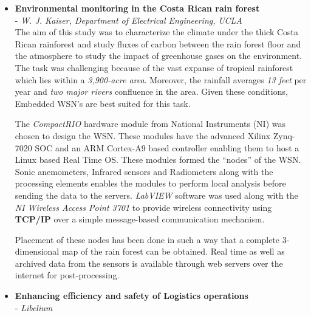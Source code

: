 \documentclass[fleqn, letterpaper, 11.5pt]{article}
\begin{document}
\begin{itemize}
\bigskip

\item \textbf{Environmental monitoring in the Costa Rican rain forest}\\
- \textit{W. J. Kaiser, Department of Electrical Engineering, UCLA} \cite{Pottie:2000:WIN:332833.332838}\\

The aim of this study was to characterize the climate under the thick Costa Rican rainforest and study fluxes of carbon between the rain forest floor and the atmosphere to study the impact of greenhouse gases on the environment. The task was challenging because of the vast expanse of tropical rainforest which lies within a \textit{3,900-acre area}. Moreover, the rainfall averages \textit{13 feet} per year and \textit{two major rivers} confluence in the area. Given these conditions, Embedded WSN's are best suited for this task.\par
The \textit{CompactRIO}\cite{CompactRIO} hardware module from National Instruments (NI) was chosen to design the WSN. These modules have the advanced Xilinx Zynq-7020 SOC and an ARM Cortex-A9 based controller enabling them to host a Linux based Real Time OS. These modules formed the \enquote{nodes} of the WSN. Sonic anemometers, Infrared sensors and Radiometers along with the processing elements enables the modules to perform local analysis before sending the data to the servers. \textit{LabVIEW} software was used along with the \textit{NI Wireless Access Point 3701}\cite{WAP3701} to provide wireless connectivity using \textbf{TCP/IP} over a simple message-based communication mechanism.\par
Placement of these nodes has been done in such a way that a complete 3-dimensional map of the rain forest can be obtained. Real time as well as archived data from the sensors is available through web servers over the internet for post-processing.\par

\bigskip

\item\textbf{Enhancing efficiency and safety of Logistics operations}\\
- \textit{Libelium}\cite{libelium}


\end{itemize}
\end{document}
